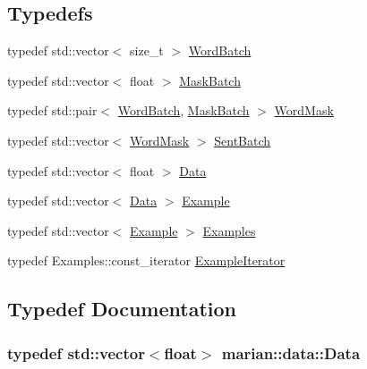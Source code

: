 \subsection*{Typedefs}
\begin{DoxyCompactItemize}
\item 
typedef std\+::vector$<$ size\+\_\+t $>$ \hyperlink{namespacemarian_1_1data_ad793aa92c2dc86a1151c32a94f5ed957}{Word\+Batch}
\item 
typedef std\+::vector$<$ float $>$ \hyperlink{namespacemarian_1_1data_a0cdbf7ceb1b0dd97d13828c95ccd76d4}{Mask\+Batch}
\item 
typedef std\+::pair$<$ \hyperlink{namespacemarian_1_1data_ad793aa92c2dc86a1151c32a94f5ed957}{Word\+Batch}, \hyperlink{namespacemarian_1_1data_a0cdbf7ceb1b0dd97d13828c95ccd76d4}{Mask\+Batch} $>$ \hyperlink{namespacemarian_1_1data_a34e6120fb1a0a79aff632179a04be607}{Word\+Mask}
\item 
typedef std\+::vector$<$ \hyperlink{namespacemarian_1_1data_a34e6120fb1a0a79aff632179a04be607}{Word\+Mask} $>$ \hyperlink{namespacemarian_1_1data_a85884cce1df2778cb81e08c80c0cd7fe}{Sent\+Batch}
\item 
typedef std\+::vector$<$ float $>$ \hyperlink{namespacemarian_1_1data_a5801e80ecb76ee38a5ac080f08d9646c}{Data}
\item 
typedef std\+::vector$<$ \hyperlink{namespacemarian_1_1data_a5801e80ecb76ee38a5ac080f08d9646c}{Data} $>$ \hyperlink{namespacemarian_1_1data_a901337b17eea9c054bbf11a10254bd7b}{Example}
\item 
typedef std\+::vector$<$ \hyperlink{namespacemarian_1_1data_a901337b17eea9c054bbf11a10254bd7b}{Example} $>$ \hyperlink{namespacemarian_1_1data_a39201a9c7e3f08ea31141ec770b60868}{Examples}
\item 
typedef Examples\+::const\+\_\+iterator \hyperlink{namespacemarian_1_1data_a45ade1945852d979da7433e0d4456bff}{Example\+Iterator}
\end{DoxyCompactItemize}


\subsection{Typedef Documentation}
\subsubsection[{\texorpdfstring{Data}{Data}}]{\setlength{\rightskip}{0pt plus 5cm}typedef std\+::vector$<$float$>$ {\bf marian\+::data\+::\+Data}}\hypertarget{namespacemarian_1_1data_a5801e80ecb76ee38a5ac080f08d9646c}{}\label{namespacemarian_1_1data_a5801e80ecb76ee38a5ac080f08d9646c}


